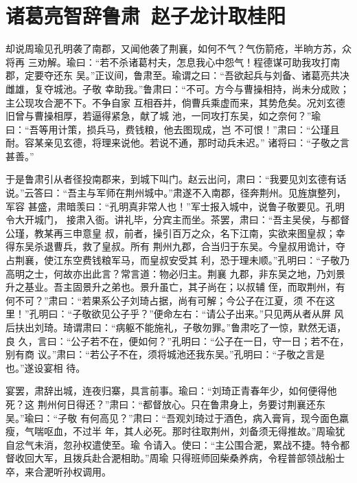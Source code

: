 \chapter{诸葛亮智辞鲁肃~赵子龙计取桂阳}

却说周瑜见孔明袭了南郡，又闻他袭了荆襄，如何不气？气伤箭疮，半晌方苏，众将再
三劝解。瑜曰：“若不杀诸葛村夫，怎息我心中怨气！程德谋可助我攻打南郡，定要夺还东
吴。”正议间，鲁肃至。瑜谓之曰：“吾欲起兵与刘备、诸葛亮共决雌雄，复夺城池。子敬
幸助我。”鲁肃曰：“不可。方今与曹操相持，尚未分成败；主公现攻合淝不下。不争自家
互相吞并，倘曹兵乘虚而来，其势危矣。况刘玄德旧曾与曹操相厚，若逼得紧急，献了城
池，一同攻打东吴，如之奈何？”瑜曰：“吾等用计策，损兵马，费钱粮，他去图现成，岂
不可恨！”肃曰：“公瑾且耐。容某亲见玄德，将理来说他。若说不通，那时动兵未迟。”
诸将曰：“子敬之言甚善。”

于是鲁肃引从者径投南郡来，到城下叫门。赵云出问，肃曰：“我要见刘玄德有话
说。”云答曰：“吾主与军师在荆州城中。”肃遂不入南郡，径奔荆州。见旌旗整列，军容
甚盛，肃暗羡曰：“孔明真非常人也！”军士报入城中，说鲁子敬要见。孔明令大开城门，
接肃入衙。讲礼毕，分宾主而坐。茶罢，肃曰：“吾主吴侯，与都督公瑾，教某再三申意皇
叔，前者，操引百万之众，名下江南，实欲来图皇叔；幸得东吴杀退曹兵，救了皇叔。所有
荆州九郡，合当归于东吴。今皇叔用诡计，夺占荆襄，使江东空费钱粮军马，而皇叔安受其
利，恐于理未顺。”孔明曰：“子敬乃高明之士，何故亦出此言？常言道：物必归主。荆襄
九郡，非东吴之地，乃刘景升之基业。吾主固景升之弟也。景升虽亡，其子尚在；以叔辅
侄，而取荆州，有何不可？”肃曰：“若果系公子刘琦占据，尚有可解；今公子在江夏，须
不在这里！”孔明曰：“子敬欲见公子乎？”便命左右：“请公子出来。”只见两从者从屏
风后扶出刘琦。琦谓肃曰：“病躯不能施礼，子敬勿罪。”鲁肃吃了一惊，默然无语，良
久，言曰：“公子若不在，便如何？”孔明曰：“公子在一日，守一日；若不在，别有商
议。”肃曰：“若公子不在，须将城池还我东吴。”孔明曰：“子敬之言是也。”遂设宴相
待。

宴罢，肃辞出城，连夜归寨，具言前事。瑜曰：“刘琦正青春年少，如何便得他死？这
荆州何日得还？”肃曰：“都督放心。只在鲁肃身上，务要讨荆襄还东吴。”瑜曰：“子敬
有何高见？”肃曰：“吾观刘琦过于酒色，病入膏肓，现今面色羸瘦，气喘呕血，不过半
年，其人必死。那时往取荆州，刘备须无得推故。”周瑜犹自忿气未消，忽孙权遣使至。瑜
令请入。使曰：“主公围合淝，累战不捷。特令都督收回大军，且拨兵赴合淝相助。”周瑜
只得班师回柴桑养病，令程普部领战船士卒，来合淝听孙权调用。

